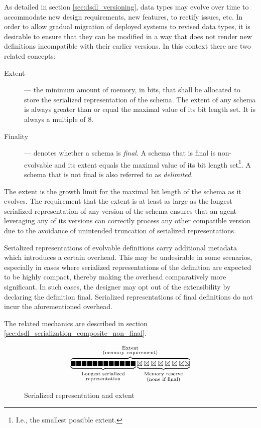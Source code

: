 As detailed in section \ref{sec:dsdl_versioning},
data types may evolve over time to accommodate new design requirements, new features, to rectify issues, etc.
In order to allow gradual migration of deployed systems to revised data types,
it is desirable to ensure that they can be modified in a way that does not render new definitions
incompatible with their earlier versions.
In this context there are two related concepts:

\begin{description}
    \item[Extent] --- the minimum amount of memory, in bits, that shall be allocated to store the serialized
    representation of the schema.
    The extent of any schema is always greater than or equal the maximal value of its bit length set.
    It is always a multiple of 8.

    \item[Finality] --- denotes whether a schema is \emph{final}.
    A schema that is final is non-evolvable and its extent equals the maximal value of its bit length set\footnote{%
        I.e., the smallest possible extent.
    }.
    A schema that is not final is also referred to as \emph{delimited}.
\end{description}

The extent is the growth limit for the maximal bit length of the schema as it evolves.
The requirement that the extent is at least as large as the longest serialized representation of
any version of the schema ensures that an agent leveraging any of its versions can
correctly process any other compatible version due to the avoidance of unintended truncation of
serialized representations.

Serialized representations of evolvable definitions carry additional metadata which introduces a certain overhead.
This may be undesirable in some scenarios, especially in cases where serialized representations of the
definition are expected to be highly compact, thereby making the overhead comparatively more significant.
In such cases, the designer may opt out of the extensibility by declaring the definition final.
Serialized representations of final definitions do not incur the aforementioned overhead.

The related mechanics are described in section \ref{sec:dsdl_serialization_composite_non_final}.

\begin{figure}[H]
    $$
    \overbrace{%
        \underbrace{%
            \blacksquare\blacksquare\blacksquare\blacksquare\blacksquare\blacksquare%
            \blacksquare\blacksquare\blacksquare\blacksquare\blacksquare\blacksquare%
        }_{\substack{\text{Longest serialized} \\ \text{representation}}}%
        \underbrace{%
            \boxtimes\boxtimes\boxtimes\boxtimes\boxtimes\boxtimes\boxtimes\boxtimes%
        }_{\substack{\text{Memory reserve} \\ \text{(none if final)}}}%
    }^{\substack{%
        \text{Extent} \\
        \text{(memory requirement)}
    }}
    $$
    \caption{Serialized representation and extent\label{fig:dsdl_extent}}
\end{figure}

